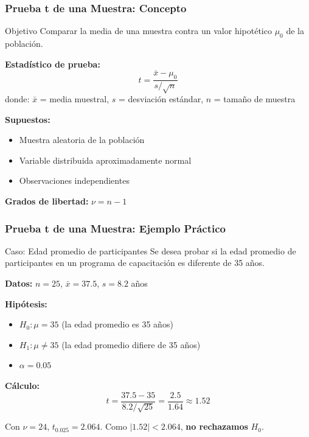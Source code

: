 \documentclass[aspectratio=169,11pt]{beamer}
\newcommand{\highlight}[1]{\textcolor{uddlight}{\bfseries #1}}
\begin{document}
\begin{frame}
  \frametitle{Prueba t de una Muestra: Concepto}
  \small
  \begin{block}{Objetivo}
    Comparar la media de una muestra contra un valor hipot\'etico $\mu_0$ de la poblaci\'on.
  \end{block}

  \textbf{Estad\'istico de prueba:}
  \[
    t = \frac{\bar{x} - \mu_0}{s / \sqrt{n}}
  \]
  donde: $\bar{x}$ = media muestral, $s$ = desviaci\'on est\'andar, $n$ = tama\~no de muestra

  \vspace{0.2cm}
  \textbf{Supuestos:}
  \begin{itemize}
    \setlength{\itemsep}{2pt}
    \item Muestra aleatoria de la poblaci\'on
    \item Variable distribuida aproximadamente normal
    \item Observaciones independientes
  \end{itemize}

  \textbf{Grados de libertad:} $\nu = n - 1$
\end{frame}

\begin{frame}
  \frametitle{Prueba t de una Muestra: Ejemplo Pr\'actico}
  \small
  \begin{exampleblock}{Caso: Edad promedio de participantes}
    Se desea probar si la edad promedio de participantes en un programa de capacitaci\'on
    es diferente de 35 a\~nos.
  \end{exampleblock}

  \textbf{Datos:} $n = 25$, $\bar{x} = 37.5$, $s = 8.2$ a\~nos

  \vspace{0.2cm}
  \textbf{Hip\'otesis:}
  \begin{itemize}
    \item $H_0: \mu = 35$ \quad (la edad promedio es 35 a\~nos)
    \item $H_1: \mu \neq 35$ \quad (la edad promedio difiere de 35 a\~nos)
    \item $\alpha = 0.05$
  \end{itemize}

  \vspace{0.2cm}
  \textbf{C\'alculo:}
  \[
    t = \frac{37.5 - 35}{8.2 / \sqrt{25}} = \frac{2.5}{1.64} \approx 1.52
  \]

  Con $\nu = 24$, $t_{0.025} = 2.064$. Como $|1.52| < 2.064$, \highlight{no rechazamos} $H_0$.
\end{frame}
\end{document}

